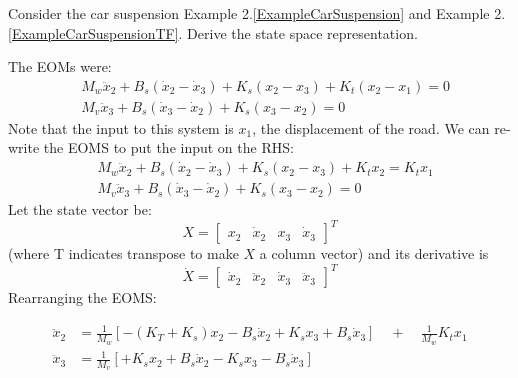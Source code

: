 \begin{Example}\label{suspensionstatespace}
Consider the car suspension 
Example 2.\ref{ExampleCarSuspension} and Example 2.\ref{ExampleCarSuspensionTF}. 
\vspace{0.2in}
Derive the state space representation.

The EOMs were:
\begin{align*}
&M_w\ddot{x}_2+B_s(\dot{x}_2-\dot{x}_3)+K_s(x_2-x_3)+K_t(x_2-x_1) =0 \\
&M_v\ddot{x}_3+B_s(\dot{x}_3-\dot{x}_2)+K_s(x_3-x_2) = 0
\end{align*}
Note that the input to this system is $x_1$, the displacement of the road.  We  can 
re-write the EOMS to put the input on the RHS:
\begin{align*}
&M_w\ddot{x}_2+B_s(\dot{x}_2-\dot{x}_3)+K_s(x_2-x_3)+K_tx_2 = K_tx_1 \\
&M_v\ddot{x}_3+B_s(\dot{x}_3-\dot{x}_2)+K_s(x_3-x_2) = 0
\end{align*}
Let the state vector be:
\[
X = \begin{bmatrix}x_2 & \dot{x}_2 & x_3 & \dot{x}_3\end{bmatrix}^T
\]
(where T indicates transpose to make $X$ a column vector)
and its derivative is
\[
\dot{X} = \begin{bmatrix}\dot{x}_2 & \ddot{x}_2 & \dot{x}_3 & \ddot{x}_3\end{bmatrix}^T
\]
Rearranging the EOMS:

\begin{align*}
\ddot{x}_2  &= \frac{1}{M_w}\left [-(K_T+K_s)x_2-B_s\dot{x}_2+K_sx_3+B_s\dot{x}_3\right]\quad+\quad \frac{1}{M_w}K_tx_1 \\
\ddot{x}_3 &= \frac{1}{M_v}\left[+K_sx_2+B_s\dot{x}_2 -K_sx_3-B_s\dot{x}_3\right] 
\end{align*}


\end{Example}
